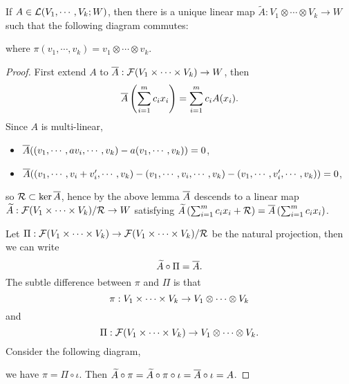 \begin{proposition}\label{12.7}
    If $A \in \mathcal{L}(V_1, \cdots, V_k; W)$, then there is a unique linear map $\widetilde{A}:V_1 \otimes \cdots \otimes V_k \to W$ such that the following diagram commutes:
    \begin{center}
    \end{center}
    where $\pi(v_1,\cdots,v_k) = v_1 \otimes \cdots \otimes v_k$. 
\end{proposition}
\begin{proof}
    First extend $A$ to $\overline{A}: \mathcal{F}(V_1 \times \cdots \times V_k) \to W$, then 
    $$\overline{A}\left(\sum_{i=1}^{m}c_i x_i\right) = \sum_{i=1}^{m}c_i A(x_i). $$ 
    Since $A$ is multi-linear, 
    \begin{itemize}
        \item $\overline{A}((v_1,\cdots,av_i,\cdots,v_k)-a(v_1,\cdots,v_k)) = 0$,
        \item $\overline{A}((v_1,\cdots,v_i+v_i',\cdots,v_k)-(v_1,\cdots,v_i,\cdots,v_k)-(v_1,\cdots,v_i',\cdots,v_k))=0$,
    \end{itemize}
    so $\mathcal{R} \subset \ker \overline{A}$, hence by the above lemma $\overline{A}$ descends to a linear map $\widetilde{A}: \mathcal{F}(V_1 \times \cdots \times V_k)/\mathcal{R} \to W$ satisfying $\widetilde{A}\left(\sum_{i=1}^{m}c_i x_i + \mathcal{R}\right) = \overline{A}\left(\sum_{i=1}^{m}c_i x_i\right)$. 
    \begin{center}
    \end{center}
    
    Let $\Pi: \mathcal{F}(V_1 \times \cdots \times V_k) \to \mathcal{F}(V_1 \times \cdots \times V_k) / \mathcal{R}$ be the natural projection, then we can write 
    $$\widetilde{A} \circ \Pi = \overline{A}. $$
    The subtle difference between $\pi$ and $\Pi$ is that 
    $$\pi: V_1 \times \cdots \times V_k \to V_1 \otimes \cdots \otimes V_k$$ and 
    $$\Pi: \mathcal{F}(V_1 \times \cdots \times V_k) \to V_1 \otimes \cdots \otimes V_k.$$ 
    Consider the following diagram,
    \begin{center}
    \end{center}
    we have $\pi = \Pi \circ \iota$. Then $\widetilde{A} \circ \pi = \widetilde{A} \circ \pi \circ \iota = \overline{A} \circ \iota = A$. 
    

\end{proof}
